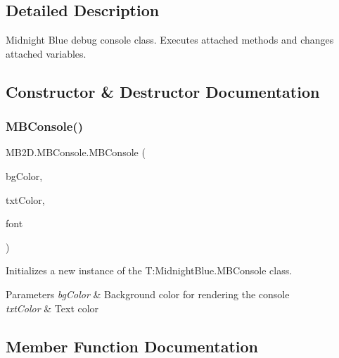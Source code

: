 \subsection{Detailed Description}
Midnight Blue debug console class. Executes attached methods and changes attached variables. 



\subsection{Constructor \& Destructor Documentation}
\hypertarget{class_m_b2_d_1_1_m_b_console_a9d251b5f9babfcb08cc519d707c9b815}{}\label{class_m_b2_d_1_1_m_b_console_a9d251b5f9babfcb08cc519d707c9b815} 
\subsubsection{\texorpdfstring{M\+B\+Console()}{MBConsole()}}
{\footnotesize\ttfamily M\+B2\+D.\+M\+B\+Console.\+M\+B\+Console (\begin{DoxyParamCaption}\item[{Color}]{bg\+Color,  }\item[{Color}]{txt\+Color,  }\item[{Sprite\+Font}]{font }\end{DoxyParamCaption})\hspace{0.3cm}{\ttfamily [inline]}}



Initializes a new instance of the T\+:\+Midnight\+Blue.\+M\+B\+Console class. 


\begin{DoxyParams}{Parameters}
{\em bg\+Color} & Background color for rendering the console\\
\hline
{\em txt\+Color} & Text color\\
\hline
\end{DoxyParams}


\subsection{Member Function Documentation}
\hypertarget{class_m_b2_d_1_1_m_b_console_a3c515ad4a199b0b67049df57fce7cb3f}{}\label{class_m_b2_d_1_1_m_b_console_a3c515ad4a199b0b67049df57fce7cb3f} 
